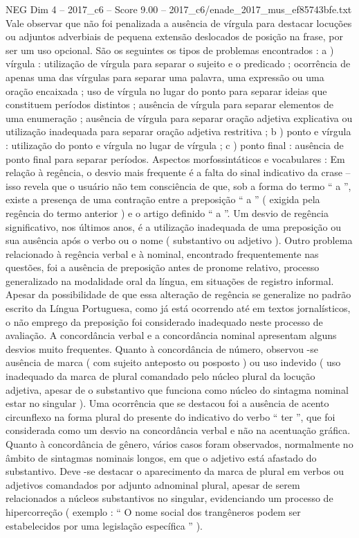 \begin{textsample}{NEG Dim 4 – 2017\_c6 – Score 9.00 – 2017\_c6/enade\_2017\_mus\_ef85743bfe.txt}
Vale observar que não foi penalizada a ausência de vírgula para destacar locuções ou adjuntos adverbiais de pequena extensão deslocados de posição na frase, por ser um uso opcional.
São os seguintes os tipos de problemas encontrados : a ) vírgula : utilização de vírgula para separar o sujeito e o predicado ; ocorrência de apenas uma das vírgulas para separar uma palavra, uma expressão ou uma oração encaixada ; uso de vírgula no lugar do ponto para separar ideias que constituem períodos distintos ; ausência de vírgula para separar elementos de uma enumeração ; ausência de vírgula para separar oração adjetiva explicativa ou utilização inadequada para separar oração adjetiva restritiva ; b ) ponto e vírgula : utilização do ponto e vírgula no lugar de vírgula ; c ) ponto final : ausência de ponto final para separar períodos.
Aspectos morfossintáticos e vocabulares : Em relação à regência, o desvio mais frequente é a falta do sinal indicativo da crase – isso revela que o usuário não tem consciência de que, sob a forma do termo “ a ”, existe a presença de uma contração entre a preposição “ a ” ( exigida pela regência do termo anterior ) e o artigo definido “ a ”.
Um desvio de regência significativo, nos últimos anos, é a utilização inadequada de uma preposição ou sua ausência após o verbo ou o nome ( substantivo ou adjetivo ).
Outro problema relacionado à regência verbal e à nominal, encontrado frequentemente nas questões, foi a ausência de preposição antes de pronome relativo, processo generalizado na modalidade oral da língua, em situações de registro informal.
Apesar da possibilidade de que essa alteração de regência se generalize no padrão escrito da Língua Portuguesa, como já está ocorrendo até em textos jornalísticos, o não emprego da preposição foi considerado inadequado neste processo de avaliação.
A concordância verbal e a concordância nominal apresentam alguns desvios muito frequentes.
Quanto à concordância de número, observou -se ausência de marca ( com sujeito anteposto ou posposto ) ou uso indevido ( uso inadequado da marca de plural comandado pelo núcleo plural da locução adjetiva, apesar de o substantivo que funciona como núcleo do sintagma nominal estar no singular ).
Uma ocorrência que se destacou foi a ausência de acento circunflexo na forma plural do presente do indicativo do verbo “ ter ”, que foi considerada como um desvio na concordância verbal e não na acentuação gráfica.
Quanto à concordância de gênero, vários casos foram observados, normalmente no âmbito de sintagmas nominais longos, em que o adjetivo está afastado do substantivo.
Deve -se destacar o aparecimento da marca de plural em verbos ou adjetivos comandados por adjunto adnominal plural, apesar de serem relacionados a núcleos substantivos no singular, evidenciando um processo de hipercorreção ( exemplo : “ O nome social dos trangêneros podem ser estabelecidos por uma legislação específica ” ).

\end{textsample}
